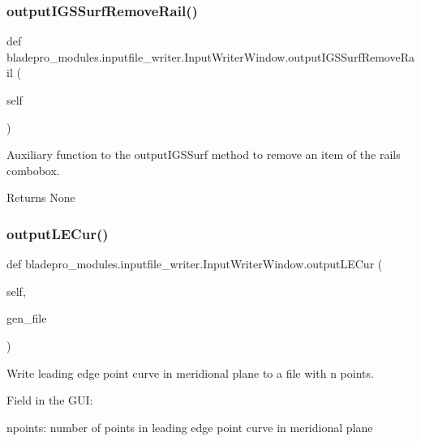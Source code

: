 \subsubsection{\texorpdfstring{output\+I\+G\+S\+Surf\+Remove\+Rail()}{outputIGSSurfRemoveRail()}}
{\footnotesize\ttfamily def bladepro\+\_\+modules.\+inputfile\+\_\+writer.\+Input\+Writer\+Window.\+output\+I\+G\+S\+Surf\+Remove\+Rail (\begin{DoxyParamCaption}\item[{}]{self }\end{DoxyParamCaption})}



Auxiliary function to the output\+I\+G\+S\+Surf method to remove an item of the rails combobox. 

\begin{DoxyReturn}{Returns}
None 
\end{DoxyReturn}
\hypertarget{classbladepro__modules_1_1inputfile__writer_1_1_input_writer_window_a55ddee4c839782858d6f53a49b9c63ec}{}\label{classbladepro__modules_1_1inputfile__writer_1_1_input_writer_window_a55ddee4c839782858d6f53a49b9c63ec} 
\subsubsection{\texorpdfstring{output\+L\+E\+Cur()}{outputLECur()}}
{\footnotesize\ttfamily def bladepro\+\_\+modules.\+inputfile\+\_\+writer.\+Input\+Writer\+Window.\+output\+L\+E\+Cur (\begin{DoxyParamCaption}\item[{}]{self,  }\item[{}]{gen\+\_\+file }\end{DoxyParamCaption})}



Write leading edge point curve in meridional plane to a file with n points. 

Field in the G\+UI\+: \begin{DoxyItemize}
\item {\ttfamily npoints\+:} number of points in leading edge point curve in meridional plane\end{DoxyItemize}

